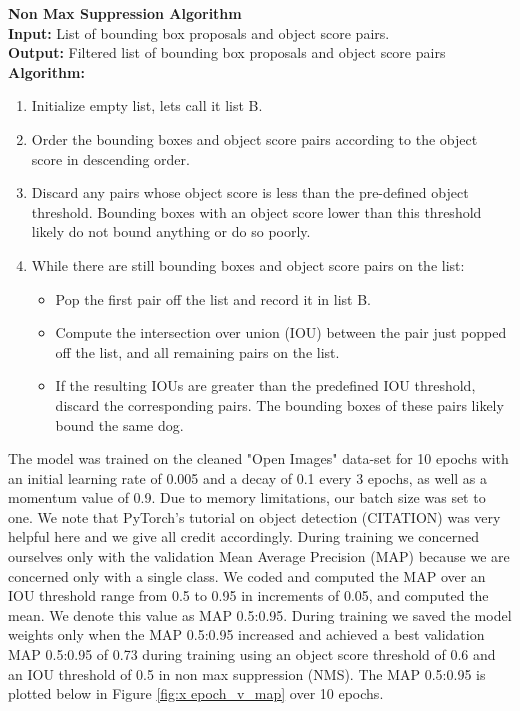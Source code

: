 \documentclass{article}
\begin{document}
\begin{minipage}{1\textwidth}%
	\noindent \textbf{Non Max Suppression Algorithm} \\

  \noindent \textbf{Input:} List of bounding box proposals and object score pairs. \\
  
  \noindent \textbf{Output:} Filtered list of bounding box proposals and object score pairs \\
  
  \noindent \textbf{Algorithm:} \\
\end{minipage}%

\begin{enumerate}

  \item Initialize empty list, lets call it list B.

  \item Order the bounding boxes and object score pairs according to the object score in descending order.
  
  \item Discard any pairs whose object score is less than the pre-defined object threshold.  Bounding boxes with an object score lower than this threshold likely do not bound anything or do so poorly.
  
  \item While there are still bounding boxes and object score pairs on the list:
        \begin{itemize}
             \item Pop the first pair off the list and record it in list B.
            
             \item Compute the intersection over union (IOU) between the pair just popped off the list, and all remaining pairs on the list.
             \item If the resulting IOUs are greater than the predefined IOU threshold, discard the corresponding pairs.  The bounding boxes of these pairs likely bound the same dog.
        \end{itemize}
\end{enumerate}


The model was trained on the cleaned "Open Images" data-set for 10 epochs with an initial learning rate of 0.005 and a decay of 0.1 every 3 epochs, as well as a momentum value of 0.9.  Due to memory limitations, our batch size was set to one.  We note that PyTorch's tutorial on object detection (CITATION) was very helpful here and we give all credit accordingly.  During training we concerned ourselves only with the validation Mean Average Precision (MAP) because we are concerned only with a single class.  We coded and computed the MAP over an IOU threshold range from 0.5 to 0.95 in increments of 0.05, and computed the mean.  We denote this value as MAP 0.5:0.95.  During training we saved the model weights only when the MAP 0.5:0.95 increased and achieved a best validation MAP 0.5:0.95 of 0.73 during training using an object score threshold of 0.6 and an IOU threshold of 0.5 in non max suppression (NMS).  The MAP 0.5:0.95 is plotted below in Figure \ref{fig:x epoch_v_map} over 10 epochs. 
\end{document}
